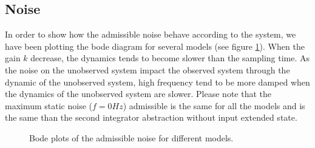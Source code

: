 \subsection{Noise}
%	
%	
%


In order to show how the admissible noise behave according to the system, we have been plotting the bode diagram for several models (see figure \ref{fig:bode_gain}).
When the gain $k$ decrease, the dynamics tends to become slower than the sampling time.
As the noise on the unobserved system impact the observed system through the dynamic of the unobserved system, high frequency tend to be more damped when the dynamics of the unobserved system are slower.
Please note that the maximum static noise ($f=0Hz$) admissible is the same for all the models and is the same than the second integrator abstraction without input extended state.

\begin{figure}

\caption{Bode plots of the admissible noise for different models.}
\label{fig:bode_gain}
\end{figure}


